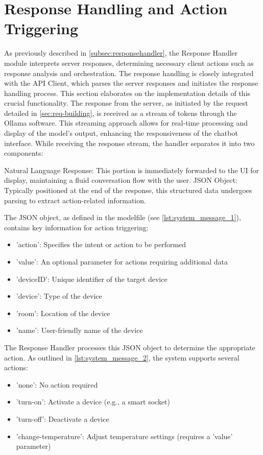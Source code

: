 \section{Response Handling and Action Triggering}
As previously described in \cref{subsec:responsehandler}, the Response Handler module interprets server responses, determining necessary client actions such as response analysis and orchestration. The response handling is closely integrated with the API Client, which parses the server responses and initiates the response handling process. This section elaborates on the implementation details of this crucial functionality.
The response from the server, as initiated by the request detailed in \cref{sec:req-building}, is received as a stream of tokens through the Ollama software. This streaming approach allows for real-time processing and display of the model's output, enhancing the responsiveness of the chatbot interface.
While receiving the response stream, the handler separates it into two components:

Natural Language Response: This portion is immediately forwarded to the UI for display, maintaining a fluid conversation flow with the user.
JSON Object: Typically positioned at the end of the response, this structured data undergoes parsing to extract action-related information.

The JSON object, as defined in the modelfile (see \cref{lst:system_message_1}), contains key information for action triggering:

\begin{itemize}
\item 'action': Specifies the intent or action to be performed
\item 'value': An optional parameter for actions requiring additional data
\item 'deviceID': Unique identifier of the target device
\item 'device': Type of the device
\item 'room': Location of the device
\item 'name': User-friendly name of the device
\end{itemize}

The Response Handler processes this JSON object to determine the appropriate action. As outlined in \cref{lst:system_message_2}, the system supports several actions:

\begin{itemize}
\item 'none': No action required
\item 'turn-on': Activate a device (e.g., a smart socket)
\item 'turn-off': Deactivate a device
\item 'change-temperature': Adjust temperature settings (requires a 'value' parameter)
\end{itemize}

